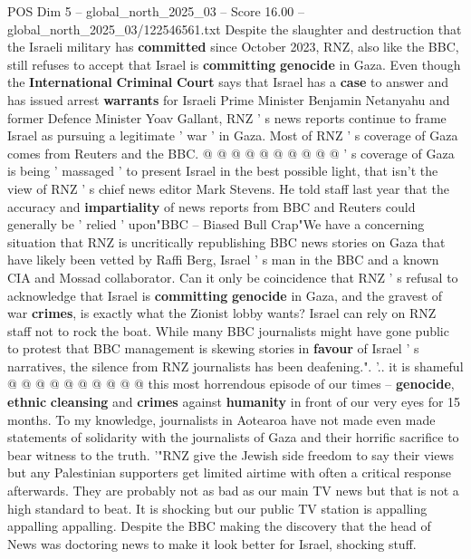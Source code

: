 \begin{textsample}{POS Dim 5 – global\_north\_2025\_03 – Score 16.00 – global\_north\_2025\_03/122546561.txt}
Despite the slaughter and destruction that the Israeli military has \textbf{committed} since October 2023, RNZ, also like the BBC, still refuses to accept that Israel is \textbf{committing} \textbf{genocide} in Gaza.
Even though the \textbf{International} \textbf{Criminal} \textbf{Court} says that Israel has a \textbf{case} to answer and has issued arrest \textbf{warrants} for Israeli Prime Minister Benjamin Netanyahu and former Defence Minister Yoav Gallant, RNZ ' s news reports continue to frame Israel as pursuing a legitimate ' war ' in Gaza.
Most of RNZ ' s coverage of Gaza comes from Reuters and the BBC. @ @ @ @ @ @ @ @ @ @ ' s coverage of Gaza is being ' massaged ' to present Israel in the best possible light, that isn't the view of RNZ ' s chief news editor Mark Stevens.
He told staff last year that the accuracy and \textbf{impartiality} of news reports from BBC and Reuters could generally be ' relied ' upon"BBC -- Biased Bull Crap"We have a concerning situation that RNZ is uncritically republishing BBC news stories on Gaza that have likely been vetted by Raffi Berg, Israel ' s man in the BBC and a known CIA and Mossad collaborator.
Can it only be coincidence that RNZ ' s refusal to acknowledge that Israel is \textbf{committing} \textbf{genocide} in Gaza, and the gravest of war \textbf{crimes}, is exactly what the Zionist lobby wants?
Israel can rely on RNZ staff not to rock the boat.
While many BBC journalists might have gone public to protest that BBC management is skewing stories in \textbf{favour} of Israel ' s narratives, the silence from RNZ journalists has been deafening.". '.. it is shameful @ @ @ @ @ @ @ @ @ @ this most horrendous episode of our times -- \textbf{genocide}, \textbf{ethnic} \textbf{cleansing} and \textbf{crimes} against \textbf{humanity} in front of our very eyes for 15 months.
To my knowledge, journalists in Aotearoa have not made even made statements of solidarity with the journalists of Gaza and their horrific sacrifice to bear witness to the truth. '"RNZ give the Jewish side freedom to say their views but any Palestinian supporters get limited airtime with often a critical response afterwards.
They are probably not as bad as our main TV news but that is not a high standard to beat.
It is shocking but our public TV station is appalling appalling appalling.
Despite the BBC making the discovery that the head of News was doctoring news to make it look better for Israel, shocking stuff.

\end{textsample}
